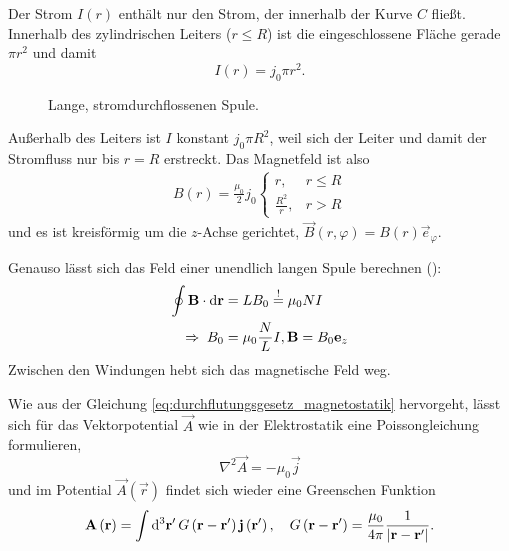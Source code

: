 Der Strom $I\left(r\right)$ enthält nur den Strom, der innerhalb der Kurve $C$ fließt. Innerhalb des zylindrischen Leiters ($r\leq R$) ist die eingeschlossene Fläche gerade $\pi r^{2}$ und damit
\begin{equation*}
	I\left(r\right)=j_{0}\pi r^{2}.
\end{equation*}


\begin{figure}[htb]
	\centering
	\tfigCoil
	\caption{Lange, stromdurchflossenen Spule. }
	\label{fig:long_coil_scheme}
\end{figure}

Außerhalb des Leiters ist $I$ konstant $j_{0}\pi R^{2}$, weil sich der Leiter und damit der Stromfluss nur bis $r=R$ erstreckt. Das Magnetfeld ist also
\begin{align*}
	B\left(r\right)=\frac{\mu _{0}}{2}j_{0}\begin{cases} r,               & r\leq R \\
              \frac{R^{2}}{r}, & r>R
	                                       \end{cases}
\end{align*}
und es ist kreisförmig um die $z$-Achse gerichtet, $\vec {B}\left(r,\varphi \right)=B\left(r\right)\vec {e}_{\varphi }$.

Genauso lässt sich das Feld einer unendlich langen Spule berechnen ():
\begin{align*}
	\oint \vec {B}\cdot \diff \vec {r} & =LB_{0}\overset{!}{=}\mu _{0}NI                   \\
	\implication B_{0}                 & =\mu _{0}\frac{N}{L}I, \vec {B}=B_{0}\vec {e}_{z}
\end{align*}
Zwischen den Windungen hebt sich das magnetische Feld weg.

Wie aus der Gleichung \eqref{eq:durchflutungsgesetz_magnetostatik} hervorgeht, lässt sich für das Vektorpotential $\vec {A}$ wie in der Elektrostatik eine Poissongleichung formulieren,
\begin{equation*}
	\nabla ^{2}\vec {A}=-\mu _{0}\vec {j}
\end{equation*}
und im Potential $\vec {A}\left(\vec {r}\right)$ findet sich wieder eine Greenschen Funktion
\begin{equation*}
	\vec {A}\left(\vec {r}\right)=\int \diffa[3]{\vec{r}'}G\left(\vec {r}-\vec {r}'\right)\vec {j}\left(\vec {r}'\right),\quad G\left(\vec {r}-\vec {r}'\right)=\frac{\mu _{0}}{4\pi }\frac{1}{\left| \vec {r}-\vec {r}'\right| }.
\end{equation*}


